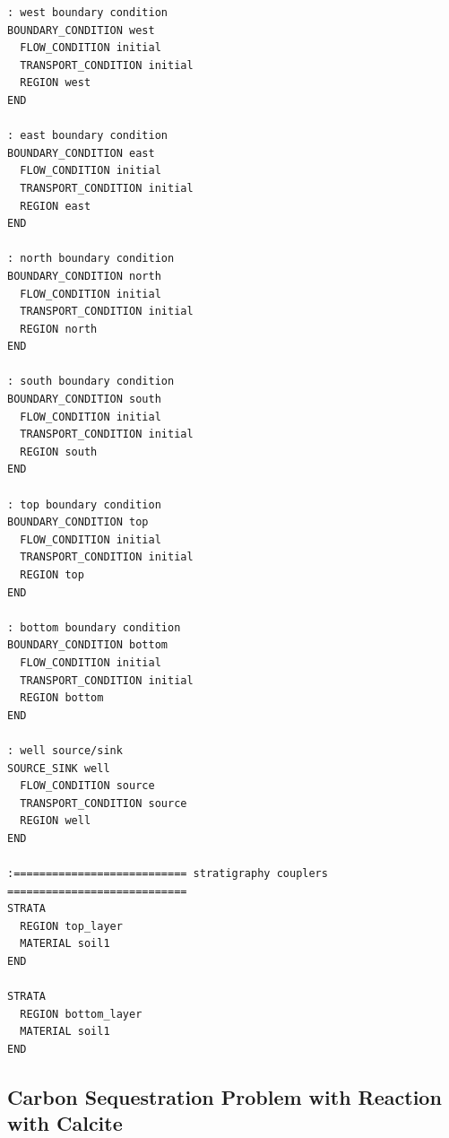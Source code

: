 \documentclass[12pt]{article}
\begin{document}
\begin{verbatim}
: west boundary condition
BOUNDARY_CONDITION west
  FLOW_CONDITION initial
  TRANSPORT_CONDITION initial
  REGION west
END

: east boundary condition
BOUNDARY_CONDITION east
  FLOW_CONDITION initial
  TRANSPORT_CONDITION initial
  REGION east
END

: north boundary condition
BOUNDARY_CONDITION north
  FLOW_CONDITION initial
  TRANSPORT_CONDITION initial
  REGION north
END

: south boundary condition
BOUNDARY_CONDITION south
  FLOW_CONDITION initial
  TRANSPORT_CONDITION initial
  REGION south
END

: top boundary condition
BOUNDARY_CONDITION top
  FLOW_CONDITION initial
  TRANSPORT_CONDITION initial
  REGION top
END

: bottom boundary condition
BOUNDARY_CONDITION bottom
  FLOW_CONDITION initial
  TRANSPORT_CONDITION initial
  REGION bottom
END

: well source/sink
SOURCE_SINK well
  FLOW_CONDITION source
  TRANSPORT_CONDITION source
  REGION well
END

:=========================== stratigraphy couplers ============================
STRATA
  REGION top_layer
  MATERIAL soil1
END

STRATA
  REGION bottom_layer
  MATERIAL soil1
END

\end{verbatim}

\normalsize

\subsection{Carbon Sequestration Problem with Reaction with Calcite}
\end{document}
